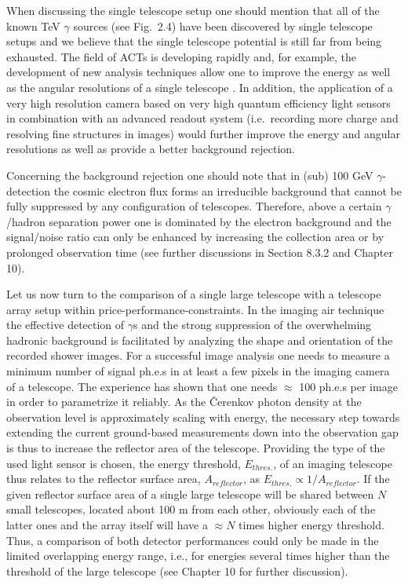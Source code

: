 When discussing the single telescope setup one should mention
that all of the known TeV $\gamma$ sources
(see Fig.~2.4) have
been discovered by single telescope setups
and we believe that the single telescope potential
is still far from being exhausted. 
The field of ACTs is developing rapidly
and, for example, the
development of new analysis
techniques allow one to improve 
the energy as well as the angular resolutions 
of a single telescope \cite{lebohec:96,ulrich:96,kranich:98}.
In addition, the application of 
a very high resolution
camera based on very high quantum efficiency light sensors
in combination with an advanced readout system (i.e.\
recording more charge and resolving fine structures in images)
would further improve the energy and angular resolutions as well
as provide a better background rejection.

Concerning the background rejection one should note that in
(sub) 100 GeV $\gamma$-detection the cosmic electron flux forms an irreducible
background that cannot be fully suppressed by any configuration of telescopes.
Therefore, above a certain $\gamma$/hadron separation power one is dominated by
the electron background and the signal/noise ratio can only be enhanced
by increasing the collection area or by prolonged observation time (see further discussions
in Section 8.3.2 and Chapter 10).

Let us now turn to the comparison of a
single large telescope with a telescope array setup within
price-performance-constraints.
In the imaging air \Cerenkov technique the effective
detection of $\gamma$s and the strong suppression of the
overwhelming hadronic background
is facilitated by analyzing the shape and orientation of the
recorded shower images. 
For a successful image analysis one needs to measure a minimum number
of signal ph.e.s in at least a few pixels 
in the imaging camera of a \Cerenkov
telescope.  The experience has shown that
one needs $\approx$ 100 ph.e.s per image in order to parametrize it
reliably.
As the \v{C}erenkov photon density at the observation level
is approximately
scaling with energy, the necessary step towards extending the current 
ground-based measurements down into the observation gap is thus
to increase the reflector area of the telescope.
Providing the type of the used light sensor is chosen, the energy threshold,
$E_{thres.}$, of an imaging telescope thus relates to the reflector
surface area,
$A_{reflector}$, as $E_{thres.} \propto 1/A_{reflector}$.
If the given reflector surface area of a single large telescope 
will be shared
between $N$ small telescopes, located 
about 100 m from each other, obviously each of the latter ones
and the array itself
will have a $\approx N$ times higher energy threshold.
Thus,
a comparison of both detector performances
could only be made in the limited overlapping energy range, i.e., for energies several
times higher than the threshold of the large telescope (see Chapter 10
for further discussion).


